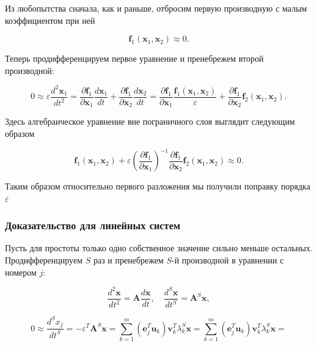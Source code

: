 	Из любопытства сначала, как и раньше, отбросим первую производную с малым коэффициентом при ней
	
	\begin{equation}
		\mathbf{f}_1(\mathbf{x}_1, \mathbf{x}_2) \approx 0.
	\end{equation}
	
	Теперь продифференцируем первое уравнение и пренебрежем второй производной:
	
	\begin{equation}
		0 \approx \varepsilon \frac{d^2 \mathbf{x}_1}{dt^2} = \frac{\partial \mathbf{f}_1}{\partial \mathbf{x}_1} \frac{d\mathbf{x}_1}{dt} + \frac{\partial \mathbf{f}_1}{\partial \mathbf{x}_2} \frac{d\mathbf{x}_2}{dt} = \frac{\partial \mathbf{f}_1}{\partial \mathbf{x}_1} \frac{\mathbf{f}_1(\mathbf{x}_1, \mathbf{x}_2)}{\varepsilon} + \frac{\partial \mathbf{f}_1}{\partial \mathbf{x}_2} \mathbf{f}_2(\mathbf{x}_1, \mathbf{x}_2).
	\end{equation}
	
	Здесь алгебраическое уравнение вне пограничного слоя выглядит следующим образом
	
	\begin{equation}
		\mathbf{f}_1(\mathbf{x}_1, \mathbf{x}_2) + \varepsilon \left( \frac{\partial \mathbf{f}_1}{\partial \mathbf{x}_1} \right)^{-1} \frac{\partial \mathbf{f}_1}{\partial \mathbf{x}_2} \mathbf{f}_2(\mathbf{x}_1, \mathbf{x}_2) \approx 0.
	\end{equation}
	
	Таким образом относительно первого разложения мы получили поправку порядка $\varepsilon$
	
	\subsubsection{Доказательство для линейных систем}
	
	Пусть для простоты только одно собственное значение сильно меньше остальных. Продифференцируем $S$ раз и пренебрежем $S$-й производной в уравнении с номером $j$:
	
	\[
	\frac{d^2 \mathbf{x}}{dt^2} = \mathbf{A} \frac{d\mathbf{x}}{dt}, \quad \frac{d^S \mathbf{x}}{dt^S} = \mathbf{A}^S \mathbf{x},
	\]
	
	\begin{equation}
		0 \approx \frac{d^S x_j}{dt^S} = -\varepsilon^T \mathbf{A}^S \mathbf{x} = \sum_{k=1}^{m} \left( \mathbf{e}_j^T \mathbf{u}_k \right) \mathbf{v}_k^T \lambda_k^S \mathbf{x} = \sum_{k=1}^{m} \left( \mathbf{e}_j^T \mathbf{u}_k \right) \mathbf{v}_k^T \lambda_k^S \mathbf{x} =
	\end{equation}
	
